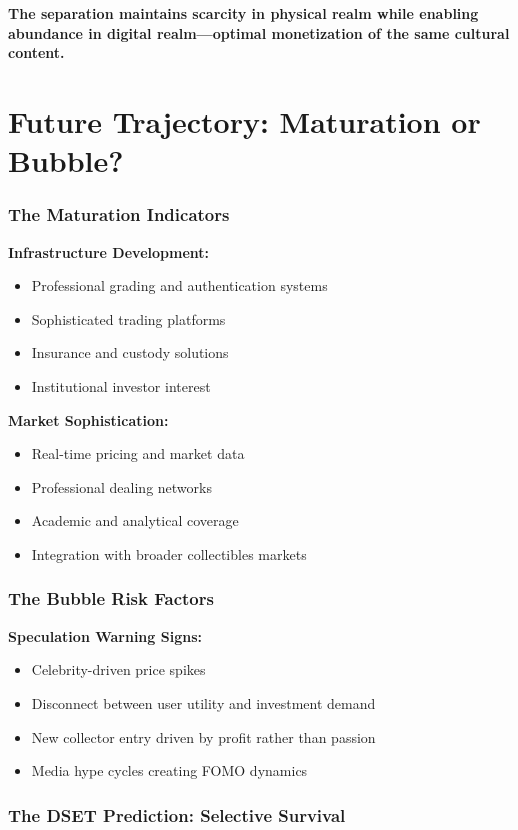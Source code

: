 \documentclass[11pt,oneside]{book}
\begin{document}
{{{{{{\textbf{The separation maintains scarcity in physical realm while enabling abundance in digital realm—optimal monetization of the same cultural content.}

\section{Future Trajectory: Maturation or Bubble?}

\subsubsection{The Maturation Indicators}

\textbf{Infrastructure Development:}
\begin{itemize}
\item Professional grading and authentication systems
\item Sophisticated trading platforms
\item Insurance and custody solutions
\item Institutional investor interest
\end{itemize}

\textbf{Market Sophistication:}
\begin{itemize}
\item Real-time pricing and market data
\item Professional dealing networks
\item Academic and analytical coverage
\item Integration with broader collectibles markets
\end{itemize}

\subsubsection{The Bubble Risk Factors}

\textbf{Speculation Warning Signs:}
\begin{itemize}
\item Celebrity-driven price spikes
\item Disconnect between user utility and investment demand
\item New collector entry driven by profit rather than passion
\item Media hype cycles creating FOMO dynamics
\end{itemize}

\subsubsection{The DSET Prediction: Selective Survival}

}}}}}}
\end{document}
